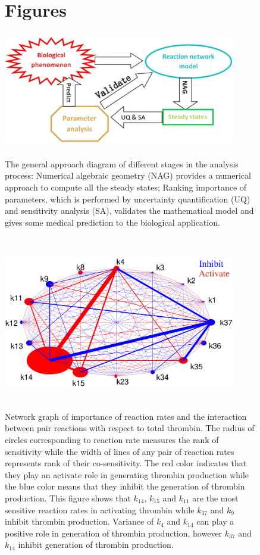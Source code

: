 
\begin{figure}
 \section*{Figures}

  \begin{center}
  \includegraphics[width=4in,height=2in]{figures/Dia.eps}
\caption{The general approach diagram of different stages in the
analysis process: Numerical algebraic geometry (NAG) provides a
numerical approach to compute all the steady states; Ranking
importance of parameters, which is performed by uncertainty
quantification (UQ) and sensitivity analysis (SA), validates the
mathematical model and gives some medical prediction to the
biological application. } \label{fig:Dia}


\includegraphics[width=4in,height=3in]{figures/NSA.eps}
\caption{Network graph of importance of reaction rates and the
interaction between pair reactions with respect to total thrombin.
The radius of circles corresponding to reaction rate measures the
rank of sensitivity while the width of lines of any pair of reaction
rates represents rank of their co-sensitivity. The red color
indicates that they play an activate role in generating thrombin
production while the blue color means that they inhibit the
generation of thrombin production. This figure shows that $k_{14}$,
$k_{15}$ and $k_{11}$ are the most sensitive reaction rates in
activating thrombin while $k_{37}$ and $k_{9}$ inhibit thrombin
production. Variance of $k_4$ and $k_{14}$ can play a positive role
in generation of thrombin production, however $k_{37}$ and $k_{14}$
inhibit generation of thrombin production.  } \label{fig:NSA1}


  \end{center}
\end{figure}
\clearpage

